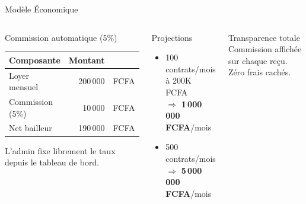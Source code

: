 ﻿\documentclass[aspectratio=169,10pt]{beamer}
\newcommand{\kcbold}[1]{\textcolor{kcCoral}{\textbf{#1}}}
\begin{document}
\begin{frame}{Mod\`{e}le \'{E}conomique}
\begin{columns}[T]
\begin{block}{Commission automatique (5\%)}
\vspace{0.15cm}
\begin{center}
\begin{tabular}{lrl}
\toprule
\textbf{Composante} & \textbf{Montant} & \\
\midrule
Loyer mensuel       & 200\,000 & FCFA \\
Commission (5\%)    & \textcolor{kcCoral}{10\,000} & FCFA \\
Net bailleur        & \textcolor{kcGreen}{190\,000} & FCFA \\
\bottomrule
\end{tabular}
\end{center}
L'admin fixe librement le taux depuis le tableau de bord.
\end{block}
\begin{alertblock}{Projections}
\begin{itemize}
\item 100 contrats/mois \`{a} 200K FCFA\\$\Rightarrow$ \kcbold{1\,000\,000 FCFA}/mois
\item 500 contrats/mois\\$\Rightarrow$ \kcbold{5\,000\,000 FCFA}/mois
\end{itemize}
\end{alertblock}
\vspace{0.3cm}
\begin{block}{Transparence totale}
Commission affich\'{e}e sur chaque re\c{c}u. Z\'{e}ro frais cach\'{e}s.
\end{block}
\end{columns}
\end{frame}
\end{document}

